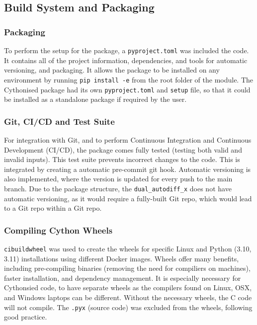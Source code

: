\subsection{Build System and Packaging}
\subsubsection{Packaging}
To perform the setup for the package, a \texttt{pyproject.toml} was included the code. 
It contains all of the project information, dependencies, 
and tools for automatic versioning, and packaging. 
It allows the package to be installed on any environment by running 
\texttt{pip install -e} from the root folder of the module.  
The Cythonised package had its own \texttt{pyproject.toml} and \texttt{setup} file, 
so that it could be installed as a standalone package if required by the user. 

\subsubsection{Git, CI/CD and Test Suite}
For integration with Git, and to perform Continuous Integration and Continuous Development (CI/CD),
the package comes fully tested (testing both valid and invalid inputs). This test suite prevents incorrect changes to the code. 
This is integrated by creating a automatic pre-commit git hook. 
Automatic versioning is also implemented, where the version is updated for every push to the main branch.
Due to the package structure, the \texttt{dual\_autodiff\_x} does not have automatic versioning,
as it would require a fully-built Git repo, which would lead to a Git repo within a Git repo.

\subsubsection{Compiling Cython Wheels}
\texttt{cibuildwheel} was used to create the wheels for specific Linux and Python (3.10, 3.11) installations using different Docker images. 
Wheels offer many benefits, including pre-compiling binaries (removing the need for compiliers on machines), 
faster installation, and dependency management. It is especially necessary for Cythonsied code, to have separate
wheels as the compilers found on Linux, OSX, and Windows laptops can be different. 
Without the necessary wheels, the C code will not compile. 
The \texttt{.pyx} (source code) was excluded from the wheels, following good practice. 

